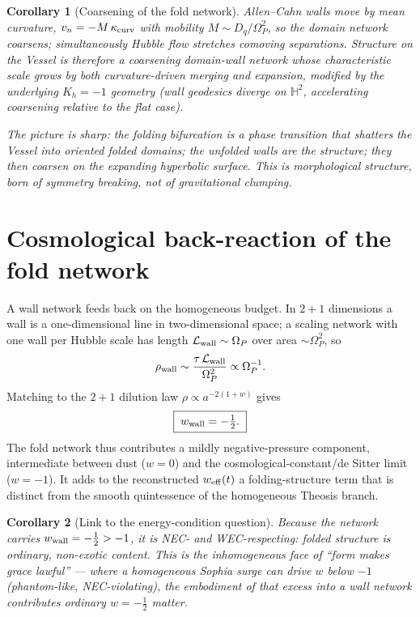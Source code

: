 \documentclass[11pt,a4paper,oneside]{book}
\newcommand{\Op}{\Omega_P}
\newcommand{\note}[1]{\textcolor{black!65}{\emph{#1}}}
\newcommand{\Hh}{\mathbb{H}^2}
\theoremstyle{plain}
\newtheorem{corollary}{Corollary}[chapter]
\theoremstyle{definition}
\theoremstyle{remark}
\begin{document}
\begin{corollary}[Coarsening of the fold network]\label{structureformation:cor:coarsen}
Allen--Cahn walls move by mean curvature, $v_n=-M\,\kappa_{\rm curv}$ with mobility $M\sim D_q/\Op^2$, so
the domain network coarsens; simultaneously Hubble flow stretches comoving separations. Structure on the
Vessel is therefore a \emph{coarsening domain-wall network} whose characteristic scale grows by both
curvature-driven merging and expansion, modified by the underlying $K_h=-1$ geometry (wall geodesics
diverge on $\Hh$, accelerating coarsening relative to the flat case).
\end{corollary}

\note{The picture is sharp: the folding bifurcation is a phase transition that shatters the Vessel into
oriented folded domains; the unfolded walls are the structure; they then coarsen on the expanding
hyperbolic surface. This is morphological structure, born of symmetry breaking, not of gravitational
clumping.}

\section{Cosmological back-reaction of the fold network}

A wall network feeds back on the homogeneous budget. In $2{+}1$ dimensions a wall is a one-dimensional
line in two-dimensional space; a scaling network with one wall per Hubble scale has length
$\mathcal L_{\rm wall}\sim\Op$ over area $\sim\Op^2$, so
\begin{equation}
\rho_{\rm wall}\sim\frac{\tau\,\mathcal L_{\rm wall}}{\Op^2}\propto\Op^{-1}.
\end{equation}
Matching to the $2{+}1$ dilution law $\rho\propto a^{-2(1+w)}$ gives
\begin{equation}
\boxed{\;w_{\rm wall}=-\tfrac12.\;}
\end{equation}
The fold network thus contributes a mildly negative-pressure component, intermediate between dust
($w=0$) and the cosmological-constant/de Sitter limit ($w=-1$). It adds to the reconstructed
$w_{\rm eff}(t)$ a folding-structure term that is distinct from the smooth quintessence of the
homogeneous Theosis branch.

\begin{corollary}[Link to the energy-condition question]
Because the network carries $w_{\rm wall}=-\tfrac12>-1$, it is NEC- and WEC-respecting: folded structure
is ordinary, non-exotic content. This is the inhomogeneous face of ``form makes grace lawful'' --- where
a homogeneous Sophia surge can drive $w$ below $-1$ (phantom-like, NEC-violating), the embodiment of that
excess into a wall network contributes ordinary $w=-\tfrac12$ matter.
\end{corollary}
\end{document}
